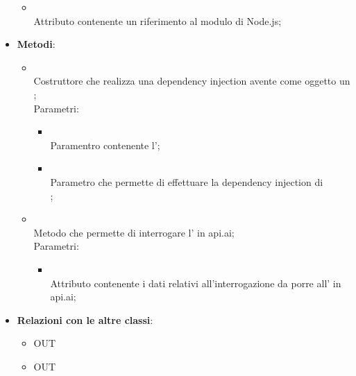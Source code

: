 \begin{itemize}
\begin{itemize}
		\item[]  \\
		Attributo contenente un riferimento al modulo  di Node.js;
	\end{itemize}
	\item \textbf{Metodi}:
	\begin{itemize}
		\item[]  \\		Costruttore che realizza una dependency injection avente come oggetto un ;\\
		Parametri:
		\begin{itemize}
			\item {} \\
			Paramentro contenente l';
			\item {} \\
			Parametro che permette di effettuare la dependency injection di \\ ;
		\end{itemize}
		\item[]  \\		Metodo che permette di interrogare l' in api.ai;\\
		Parametri:
		\begin{itemize}
			\item {} \\
			Attributo contenente i dati relativi all'interrogazione da porre all' in api.ai;
		\end{itemize}
	\end{itemize}
	\item \textbf{Relazioni con le altre classi}:
	\begin{itemize}
		\item OUT \hyperlink{Agent_label}{}
		\item OUT \hyperlink{VAQuery_label}{}
	\end{itemize}
\end{itemize}
\FloatBarrier


